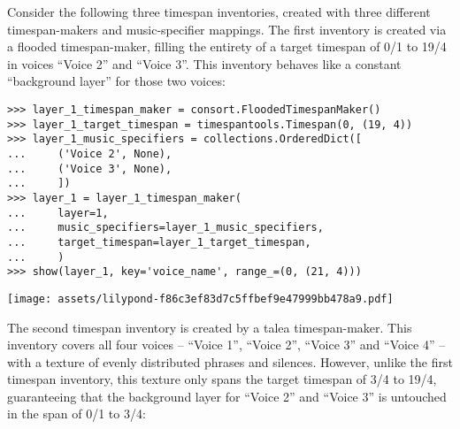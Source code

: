Consider the following three timespan inventories, created with three different
timespan-makers and music-specifier mappings. The first inventory is created
via a flooded timespan-maker, filling the entirety of a target timespan of 0/1
to 19/4 in voices \enquote{Voice 2} and \enquote{Voice 3}. This inventory
behaves like a constant \enquote{background layer} for those two voices:

\begin{comment}
<abjad>
layer_1_timespan_maker = consort.FloodedTimespanMaker()
layer_1_target_timespan = timespantools.Timespan(0, (19, 4))
layer_1_music_specifiers = collections.OrderedDict([
    ('Voice 2', None),
    ('Voice 3', None),
    ])
layer_1 = layer_1_timespan_maker(
    layer=1,
    music_specifiers=layer_1_music_specifiers,
    target_timespan=layer_1_target_timespan,
    )
show(layer_1, key='voice_name', range_=(0, (21, 4)))
</abjad>
\end{comment}

\begin{abjadbookoutput}
\begin{singlespacing}
\vspace{-0.5\baselineskip}
\begin{lstlisting}
>>> layer_1_timespan_maker = consort.FloodedTimespanMaker()
>>> layer_1_target_timespan = timespantools.Timespan(0, (19, 4))
>>> layer_1_music_specifiers = collections.OrderedDict([
...     ('Voice 2', None),
...     ('Voice 3', None),
...     ])
>>> layer_1 = layer_1_timespan_maker(
...     layer=1,
...     music_specifiers=layer_1_music_specifiers,
...     target_timespan=layer_1_target_timespan,
...     )
>>> show(layer_1, key='voice_name', range_=(0, (21, 4)))
\end{lstlisting}
\noindent\texttt{[image: assets/lilypond-f86c3ef83d7c5ffbef9e47999bb478a9.pdf]}
\end{singlespacing}
\end{abjadbookoutput}

\noindent The second timespan inventory is created by a talea timespan-maker.
This inventory covers all four voices -- \enquote{Voice 1}, \enquote{Voice 2},
\enquote{Voice 3} and \enquote{Voice 4} -- with a texture of evenly distributed
phrases and silences. However, unlike the first timespan inventory, this
texture only spans the target timespan of 3/4 to 19/4, guaranteeing that the
background layer for \enquote{Voice 2} and \enquote{Voice 3} is untouched in
the span of 0/1 to 3/4:


